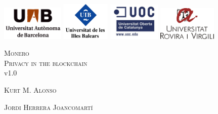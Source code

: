 \documentclass[a4paper,11pt,english,oneside,onecolumn,final,openany]{report}
\begin{document}

\pagestyle{plain}
\thispagestyle{empty}

\mbox{}
\vspace{1cm}
\begin{center}
  \includegraphics[width=3cm]{front/figures/logo_uab.jpg}
  \hspace{0.5cm}
  \includegraphics[width=2.3cm]{front/figures/logo_uib.jpg}
  \hspace{0.5cm}
  \includegraphics[width=2.5cm]{front/figures/logo_uoc.jpg}
  \hspace{0.5cm}
  \includegraphics[width=2.8cm]{front/figures/logo_urv.jpg}
\end{center}


\vfill{}
{\par\centering \textsc{\LARGE Monero \\Privacy in the blockchain}\\v1.0
	\par
}
\bigskip
{\par\centering \textsc{\large Kurt M. Alonso \\ }
\par \textsc{\large Jordi Herrera Joancomartí }\par}
\vfill{}

\begin{center}
  \begin{minipage}[t]{0.8\columnwidth}
 
  
  
  \end{minipage}
\end{center}
\end{document}
